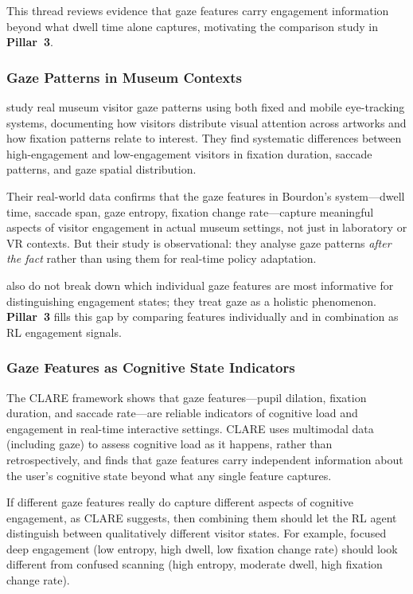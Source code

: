 \documentclass[a4paper, 11pt]{article}
\newcommand{\pillar}[1]{\textbf{Pillar~#1}}
\begin{document}
This thread reviews evidence that gaze features carry engagement information beyond what dwell time alone captures, motivating the comparison study in \pillar{3}.

\subsubsection{Gaze Patterns in Museum Contexts}

\citet{milekic2025museum} study real museum visitor gaze patterns using both fixed and mobile eye-tracking systems, documenting how visitors distribute visual attention across artworks and how fixation patterns relate to interest. They find systematic differences between high-engagement and low-engagement visitors in fixation duration, saccade patterns, and gaze spatial distribution.

Their real-world data confirms that the gaze features in Bourdon's system---dwell time, saccade span, gaze entropy, fixation change rate---capture meaningful aspects of visitor engagement in actual museum settings, not just in laboratory or VR contexts. But their study is observational: they analyse gaze patterns \emph{after the fact} rather than using them for real-time policy adaptation.

\citet{milekic2025museum} also do not break down which individual gaze features are most informative for distinguishing engagement states; they treat gaze as a holistic phenomenon. \pillar{3} fills this gap by comparing features individually and in combination as RL engagement signals.

\subsubsection{Gaze Features as Cognitive State Indicators}

The CLARE framework \citep{clare2024} shows that gaze features---pupil dilation, fixation duration, and saccade rate---are reliable indicators of cognitive load and engagement in real-time interactive settings. CLARE uses multimodal data (including gaze) to assess cognitive load as it happens, rather than retrospectively, and finds that gaze features carry independent information about the user's cognitive state beyond what any single feature captures.

If different gaze features really do capture different aspects of cognitive engagement, as CLARE suggests, then combining them should let the RL agent distinguish between qualitatively different visitor states. For example, focused deep engagement (low entropy, high dwell, low fixation change rate) should look different from confused scanning (high entropy, moderate dwell, high fixation change rate).
\end{document}
